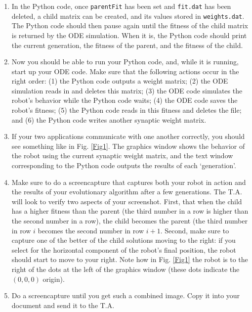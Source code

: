 \documentclass[12pt]{article}
\begin{document}
\begin{enumerate}
\item In the Python code, once \texttt{parentFit} has been set and \texttt{fit.dat} has been deleted, a child matrix can be created, and its values stored in \texttt{weights.dat}. The Python code should then pause again until the fitness of the child matrix is returned by the ODE simulation. When it is, the Python code should print the current generation, the fitness of the parent, and the fitness of the child.

\item Now you should be able to run your Python code, and, while it is running, start up your ODE code. Make sure that the following actions occur in the right order: (1) the Python code outputs a weight matrix; (2) the ODE simulation reads in and deletes this matrix; (3) the ODE code simulates the robot's behavior while the Python code waits; (4) the ODE code saves the robot's fitness; (5) the Python code reads in this fitness and deletes the file; and (6) the Python code writes another synaptic weight matrix.

\item If your two applications communicate with one another correctly, you should see something like in Fig. \ref{Fig1}. The graphics window shows the behavior of the robot using the current synaptic weight matrix, and the text window corresponding to the Python code outputs the results of each `generation'.

\item Make sure to do a screencapture that captures both your robot in action and the results of your evolutionary algorithm after a few generations. The T.A. will look to verify two aspects of your screenshot. First, that when the child has a higher fitness than the parent (the third number in a row is higher than the second number in a row), the child becomes the parent (the third number in row $i$ becomes the second number in row $i+1$. Second, make sure to capture one of the better of the child solutions moving to the right: if you select for the horizontal component of the robot's final position, the robot should start to move to your right. Note how in Fig. \ref{Fig1} the robot is to the right of the dots at the left of the graphics window (these dots indicate the $(0,0,0)$ origin).

\item Do a screencapture until you get such a combined image. Copy it into your document and send it to the T.A.

\end{enumerate}
\end{document}
